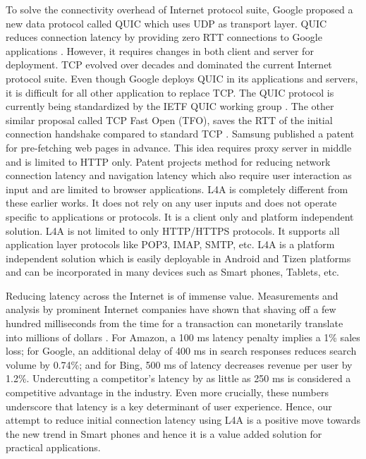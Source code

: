 \begin{multicols}{2}
To solve the connectivity overhead of Internet protocol suite, Google proposed a new data protocol called QUIC which uses UDP as transport layer. QUIC reduces connection latency by providing zero RTT connections to Google applications \cite{art1-key18}. However, it requires changes in both client and server for deployment. TCP evolved over decades and dominated the current Internet protocol suite. Even though Google deploys QUIC in its applications and  servers, it is difficult for all other application to replace TCP. The QUIC protocol is currently being standardized by the IETF QUIC working group \cite{art1-key19}. The other similar proposal called TCP Fast Open (TFO), saves the RTT of the initial connection handshake compared to standard TCP \cite{art1-key20}. Samsung published a patent \cite{art1-key21} for pre-fetching web pages in advance. This idea requires proxy server in middle and is limited to HTTP only. Patent \cite{art1-key22} projects method for reducing network connection latency and navigation latency which also require user interaction as input and are limited to browser applications. L4A is completely different from these earlier works. It does not rely on any user inputs and does not operate specific to applications or protocols. It is a client only and platform independent solution.  L4A is not limited to only HTTP/HTTPS protocols. It supports all application layer protocols like POP3, IMAP, SMTP, etc. L4A is a platform independent solution which is easily deployable in Android and Tizen platforms and can be incorporated in many devices such as Smart phones, Tablets, etc.

Reducing latency across the Internet is of immense value. Measurements and analysis by prominent Internet companies have shown that shaving off a few hundred milliseconds from the time for a transaction can monetarily translate into millions of dollars \cite{art1-key23}. For Amazon, a 100 ms latency penalty implies a 1\% sales loss; for Google, an additional delay of 400 ms in search responses reduces search volume by 0.74\%; and for Bing, 500 ms of latency decreases revenue per user by 1.2\%. Undercutting a competitor’s latency by as little as 250 ms is considered a competitive advantage in the industry. Even more crucially, these numbers underscore that latency is a key determinant of user experience. Hence, our attempt to reduce initial connection latency using L4A is a positive move towards the new trend in Smart phones and hence it is a value added solution for practical applications. 


\end{multicols}
